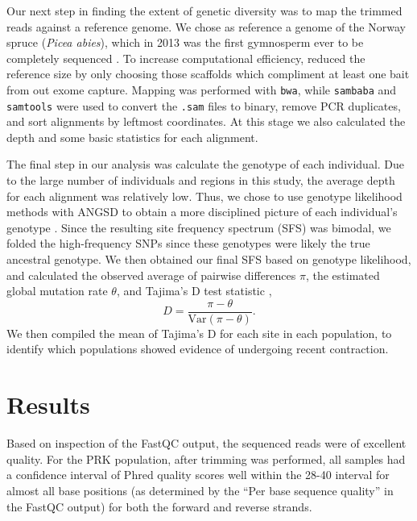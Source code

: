 \documentclass[11pt]{scrartcl}
\begin{document}
Our next step in finding the extent of genetic diversity was to map
the trimmed reads against a reference genome. We chose as reference a
genome of the Norway spruce (\textit{Picea abies}), which in 2013 was
the first gymnosperm ever to be completely sequenced
\cite{Nystedt2013}. To increase computational efficiency, reduced the
reference size by only choosing those scaffolds which compliment at
least one bait from out exome capture. Mapping was performed with
\texttt{bwa}, while \texttt{sambaba} and \texttt{samtools} were used
to convert the \texttt{.sam} files to binary, remove PCR duplicates,
and sort alignments by leftmost coordinates. At this stage we also
calculated the depth and some basic statistics for each alignment.

The final step in our analysis was calculate the genotype of each
individual. Due to the large number of individuals and regions in this
study, the average depth for each alignment was relatively low. Thus,
we chose to use genotype likelihood methods with ANGSD to obtain a
more disciplined picture of each individual's genotype
\cite{Korneliussen2014}. Since the resulting site frequency spectrum
(SFS) was bimodal, we folded the high-frequency SNPs since these
genotypes were likely the true ancestral genotype. We then obtained
our final SFS based on genotype likelihood, and calculated the
observed average of pairwise differences $\pi$, the estimated global
mutation rate $\theta$, and Tajima's D test statistic
\cite{Tajima1989},
\begin{equation}
  \label{eq:taj-D}
  D = \frac{\pi - \theta}{\text{Var}(\pi - \theta)}.
\end{equation}
We then compiled the mean of Tajima's D for each site in each
population, to identify which populations showed evidence of
undergoing recent
contraction. %

\section{Results}
\label{sec:results}

Based on inspection of the FastQC output, the sequenced reads were of
excellent quality. For the PRK population, after trimming was
performed, all samples had a confidence interval of Phred quality
scores well within the 28-40 interval for almost all base positions
(as determined by the ``Per base sequence quality'' in the FastQC
output) for both the forward and reverse strands.
\end{document}
